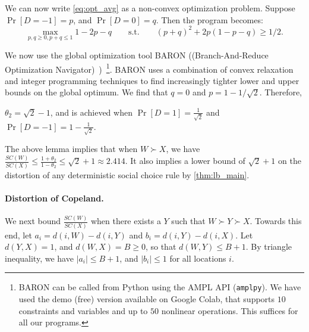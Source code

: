We can now write \cref{eq:opt_avg} as a non-convex optimization problem. Suppose $\Pr[D = -1] = p$, and $\Pr[D = 0] = q$. Then the program becomes:
\begin{equation}
\max_{p,q \ge 0, p+q \le 1} 1 - 2p - q \qquad \mbox{s.t.} \qquad (p+q)^2 + 2 p (1-p-q) \ge 1/2.
\end{equation}

We now use the global optimization tool  BARON ((Branch-And-Reduce Optimization Navigator)~\cite{Sahinidis1996,KS18})~\cite{Sahinidis1996}\footnote{BARON can be called from Python using the AMPL API ({\tt amplpy}).  We have used the demo (free) version available on Google Colab, that supports $10$ constraints and variables and up to $50$ nonlinear operations. This suffices for all our programs. }.  BARON uses a combination of convex relaxation and integer programming techniques to find increasingly tighter lower and upper bounds on the global optimum. We find that $q = 0$ and $p = 1 - 1/\sqrt{2}$. Therefore,

\begin{lemma}
\label{lem:theta2}
    $\theta_2 = \sqrt{2} - 1$, and is achieved when $\Pr[D = 1] = \frac{1}{\sqrt{2}}$ and $\Pr[D = -1] = 1 - \frac{1}{\sqrt{2}}$. 
\end{lemma}

The above lemma implies that when $W \succ X$, we have $\frac{SC(W)}{SC(X)} \le \frac{1+\theta_2}{1-\theta_2} \le \sqrt{2} + 1 \approx 2.414$. It also implies a lower bound of $\sqrt{2} + 1$ on the distortion of any deterministic social choice rule by \cref{thm:lb_main}.

\paragraph{Distortion of Copeland.} We next bound $\frac{SC(W)}{SC(X)}$ when there exists a $Y$ such that $W \succ Y \succ X$. Towards this end, let $a_i = d(i,W) - d(i,Y)$ and $b_i = d(i,Y) - d(i,X)$. Let $d(Y,X) = 1$, and $d(W,X) = B \ge 0$, so that $d(W,Y) \le B+1$. By triangle inequality, we have $|a_i| \le B+1$, and $|b_i| \le 1$ for all locations $i$. 

